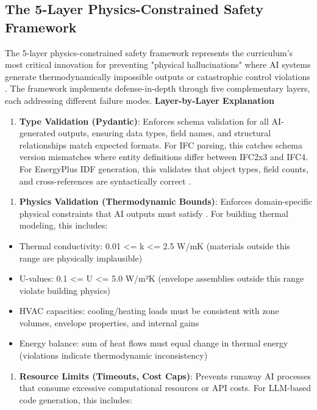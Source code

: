 \documentclass[12pt,a4paper]{article}
\begin{document}
\subsection{The 5-Layer Physics-Constrained Safety Framework}
The 5-layer physics-constrained safety framework represents the curriculum's most critical innovation for preventing "physical hallucinations" where AI systems generate thermodynamically impossible outputs or catastrophic control violations \cite{ref170}. The framework implements defense-in-depth through five complementary layers, each addressing different failure modes.
\textbf{Layer-by-Layer Explanation}
\begin{enumerate}
  \item \textbf{Type Validation (Pydantic)}: Enforces schema validation for all AI-generated outputs, ensuring data types, field names, and structural relationships match expected formats. For IFC parsing, this catches schema version mismatches where entity definitions differ between IFC2x3 and IFC4. For EnergyPlus IDF generation, this validates that object types, field counts, and cross-references are syntactically correct \cite{ref123}.
\end{enumerate}
\begin{enumerate}[resume]
  \item \textbf{Physics Validation (Thermodynamic Bounds)}: Enforces domain-specific physical constraints that AI outputs must satisfy \cite{ref170}. For building thermal modeling, this includes:
\end{enumerate}
\begin{itemize}
  \item Thermal conductivity: 0.01 <= k <= 2.5 W/mK (materials outside this range are physically implausible) \cite{ref170}
  \item U-values: 0.1 <= U <= 5.0 W/m²K (envelope assemblies outside this range violate building physics)
  \item HVAC capacities: cooling/heating loads must be consistent with zone volumes, envelope properties, and internal gains
  \item Energy balance: sum of heat flows must equal change in thermal energy (violations indicate thermodynamic inconsistency) \cite{ref179}
\end{itemize}
\begin{enumerate}[resume]
  \item \textbf{Resource Limits (Timeouts, Cost Caps)}: Prevents runaway AI processes that consume excessive computational resources or API costs. For LLM-based code generation, this includes:
\end{enumerate}
\end{document}
